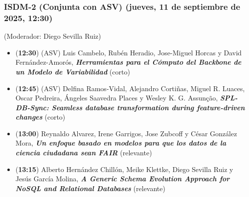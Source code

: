 \begin{frame}
  \frametitle{ISDM-2 (Conjunta con ASV) (jueves, 11 de septiembre de 2025, 12:30)}
{\small (Moderador: Diego Sevilla Ruiz)}
\begin{itemize}

\item ({\bf 12:30}) (ASV) Luis Cambelo, Rubén Heradio, Jose-Miguel Horcas y David Fernández-Amorós, %
      {\bfseries\itshape Herramientas para el Cómputo del Backbone de un Modelo de Variabilidad} %
      (corto)

\item ({\bf 12:45}) (ASV) Delfina Ramos-Vidal, Alejandro Cortiñas, Miguel R. Luaces, Oscar Pedreira, Ángeles Saavedra Places y Wesley K. G. Assunção, %
      {\bfseries\itshape SPL-DB-Sync: Seamless database transformation during feature-driven changes} %
      (corto)

\item ({\bf 13:00}) Reynaldo Alvarez, Irene Garrigos, Jose Zubcoff y César González Mora, %
      {\bfseries\itshape Un enfoque basado en modelos para que los datos de la ciencia ciudadana sean FAIR} %
      (relevante)

\item ({\bf 13:15}) Alberto Hernández Chillón, Meike Klettke, Diego Sevilla Ruiz y Jesús García Molina, %
      {\bfseries\itshape A Generic Schema Evolution Approach for NoSQL and Relational Databases} %
      (relevante)

\end{itemize}
\end{frame}
